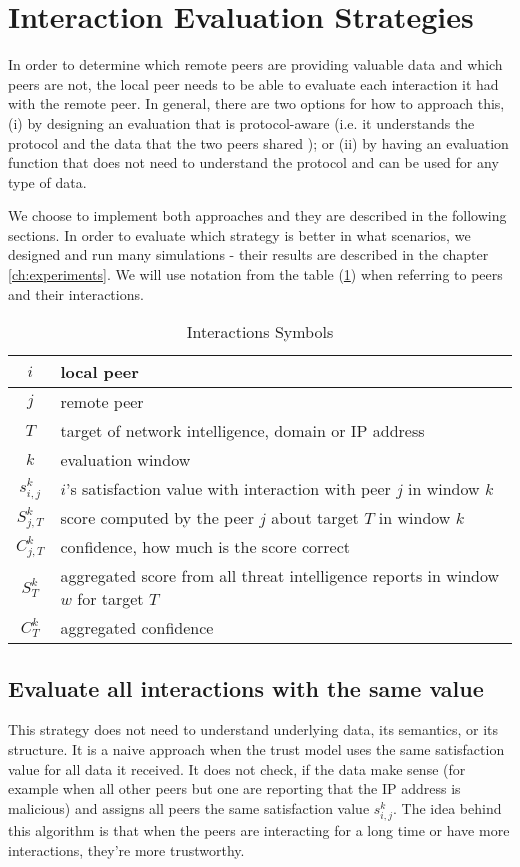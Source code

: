 \section{Interaction Evaluation Strategies}
\label{sec:interaction-evaluation-strategies}
In order to determine which remote peers are providing valuable data and which peers are not, the local peer needs to be able to evaluate each interaction it had with the remote peer.
In general, there are two options for how to approach this, (i) by designing an evaluation that is protocol-aware (i.e. it understands the protocol and the data that the two peers shared ); or (ii) by having an evaluation function that does not need to understand the protocol and can be used for any type of data.

We choose to implement both approaches and they are described in the following sections. In order to evaluate which strategy is better in what scenarios, we designed and run many simulations - their results are described in the chapter \ref{ch:experiments}. 
We will use notation from the table (\ref{table:interaction-eval})  when referring to peers and their interactions.

\begin{table}[h!]
\centering
\begin{tabular}{ c | m{20em} }
 $i$ & local peer \\
 \hline
 $j$ & remote peer \\
 \hline
 $T$ & target of network intelligence, domain or IP address \\
 \hline
 $k$ & evaluation window \\
 \hline
 $s^{k}_{i, j}$ & $i$'s satisfaction value with interaction with peer $j$ in window $k$\\
 \hline
 $S^{k}_{j, T}$ & score computed by the peer $j$ about target $T$ in window $k$ \\
 \hline
 $C^{k}_{j, T}$ & confidence, how much is the score correct \\
 \hline
 $S^{k}_{T}$ & aggregated score from all threat intelligence reports in window $w$ for target $T$ \\
 \hline
 $C^{k}_{T}$ & aggregated confidence
\end{tabular}
\caption{Interactions Symbols}
\label{table:interaction-eval}
\end{table}

\subsection{Evaluate all interactions with the same value}
\label{subsec:same-eval-for-all-interactions}
This strategy does not need to understand underlying data, its semantics, or its structure.
It is a naive approach when the trust model uses the same satisfaction value for all data it received. It does not check, if the data make sense (for example when all other peers but one are reporting that the IP address is malicious) and assigns all peers the same satisfaction value $s^{k}_{i, j}$. 
The idea behind this algorithm is that when the peers are interacting for a long time or have more interactions, they're more trustworthy.

